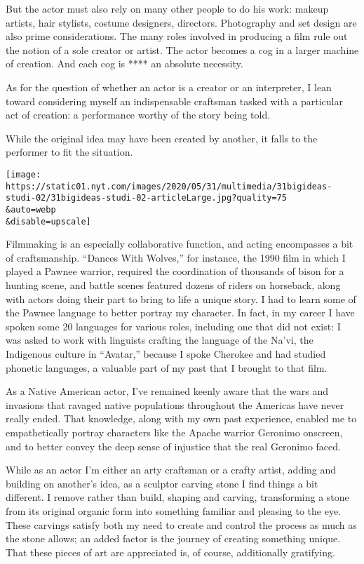 But the actor must also rely on many other people to do his work: makeup
artists, hair stylists, costume designers, directors. Photography and
set design are also prime considerations. The many roles involved in
producing a film rule out the notion of a sole creator or artist. The
actor becomes a cog in a larger machine of creation. And each cog is
**** an absolute necessity.

As for the question of whether an actor is a creator or an interpreter,
I lean toward considering myself an indispensable craftsman tasked with
a particular act of creation: a performance worthy of the story being
told.

While the original idea may have been created by another, it falls to
the performer to fit the situation.

\texttt{[image: https://static01.nyt.com/images/2020/05/31/multimedia/31bigideas-studi-02/31bigideas-studi-02-articleLarge.jpg?quality=75\\\&auto=webp\\\&disable=upscale]}

Filmmaking is an especially collaborative function, and acting
encompasses a bit of craftsmanship. ``Dances With Wolves,'' for
instance, the 1990 film in which I played a Pawnee warrior, required the
coordination of thousands of bison for a hunting scene, and battle
scenes featured dozens of riders on horseback, along with actors doing
their part to bring to life a unique story. I had to learn some of the
Pawnee language to better portray my character. In fact, in my career I
have spoken some 20 languages for various roles, including one that did
not exist: I was asked to work with linguists crafting the language of
the Na'vi, the Indigenous culture in ``Avatar,'' because I spoke
Cherokee and had studied phonetic languages, a valuable part of my past
that I brought to that film.

As a Native American actor, I've remained keenly aware that the wars and
invasions that ravaged native populations throughout the Americas have
never really ended. That knowledge, along with my own past experience,
enabled me to empathetically portray characters like the Apache warrior
Geronimo onscreen, and to better convey the deep sense of injustice that
the real Geronimo faced.

While as an actor I'm either an arty craftsman or a crafty artist,
adding and building on another's idea, as a sculptor carving stone I
find things a bit different. I remove rather than build, shaping and
carving, transforming a stone from its original organic form into
something familiar and pleasing to the eye. These carvings satisfy both
my need to create and control the process as much as the stone allows;
an added factor is the journey of creating something unique. That these
pieces of art are appreciated is, of course, additionally gratifying.

